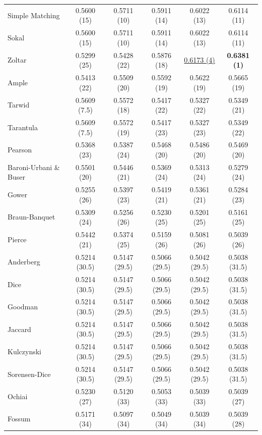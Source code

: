 \begin{table}[t]
{\begin{tabular}{lccccc}
Simple Matching & 0.5600 (15) & 0.5711 (10) & 0.5911 (14) & 0.6022 (13) & 0.6114 (11) \\
Sokal & 0.5600 (15) & 0.5711 (10) & 0.5911 (14) & 0.6022 (13) & 0.6114 (11) \\
Zoltar & 0.5299 (25) & 0.5428 (22) & 0.5876 (18) & \underline{0.6173 (4)} & \textbf{0.6381 (1)} \\
Ample & 0.5413 (22) & 0.5509 (20) & 0.5592 (19) & 0.5622 (19) & 0.5665 (19) \\
Tarwid & 0.5609 (7.5) & 0.5572 (18) & 0.5417 (22) & 0.5327 (22) & 0.5349 (21) \\
Tarantula & 0.5609 (7.5) & 0.5572 (19) & 0.5417 (23) & 0.5327 (23) & 0.5349 (22) \\
Pearson & 0.5368 (23) & 0.5387 (24) & 0.5468 (20) & 0.5486 (20) & 0.5469 (20) \\
Baroni-Urbani \& Buser & 0.5501 (20) & 0.5446 (21) & 0.5369 (24) & 0.5313 (24) & 0.5279 (24) \\
Gower & 0.5255 (26) & 0.5397 (23) & 0.5419 (21) & 0.5361 (21) & 0.5284 (23) \\
Braun-Banquet & 0.5309 (24) & 0.5256 (26) & 0.5230 (25) & 0.5201 (25) & 0.5161 (25) \\
Pierce & 0.5442 (21) & 0.5374 (25) & 0.5159 (26) & 0.5081 (26) & 0.5039 (26) \\
Anderberg & 0.5214 (30.5) & 0.5147 (29.5) & 0.5066 (29.5) & 0.5042 (29.5) & 0.5038 (31.5) \\
Dice & 0.5214 (30.5) & 0.5147 (29.5) & 0.5066 (29.5) & 0.5042 (29.5) & 0.5038 (31.5) \\
Goodman & 0.5214 (30.5) & 0.5147 (29.5) & 0.5066 (29.5) & 0.5042 (29.5) & 0.5038 (31.5) \\
Jaccard & 0.5214 (30.5) & 0.5147 (29.5) & 0.5066 (29.5) & 0.5042 (29.5) & 0.5038 (31.5) \\
Kulczynski & 0.5214 (30.5) & 0.5147 (29.5) & 0.5066 (29.5) & 0.5042 (29.5) & 0.5038 (31.5) \\
Sorensen-Dice & 0.5214 (30.5) & 0.5147 (29.5) & 0.5066 (29.5) & 0.5042 (29.5) & 0.5038 (31.5) \\
Ochiai & 0.5230 (27) & 0.5120 (33) & 0.5053 (33) & 0.5039 (33) & 0.5039 (27) \\
Fossum & 0.5171 (34) & 0.5097 (34) & 0.5049 (34) & 0.5039 (34) & 0.5039 (28) \\
\bottomrule
\end{tabular}
}
\end{table}
